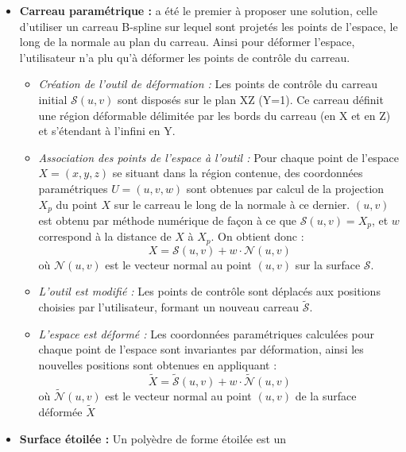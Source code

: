 \begin{itemize}
\item{\textbf{Carreau paramétrique :}} \cite{JLQ96} a été le premier à
  proposer une solution, celle d'utiliser un carreau B-spline sur
  lequel sont projetés les points de l'espace, le long de la normale
  au plan du carreau. Ainsi pour déformer l'espace, l'utilisateur n'a
  plu qu'à déformer les points de contrôle du carreau.
  \begin{itemize}
  \item{\textit{Création de l'outil de déformation :}} Les points de
    contrôle du carreau initial \( \mathcal{S}(u,v) \) sont disposés
    sur le plan XZ (Y=1). Ce carreau définit une région déformable
    délimitée par les bords du carreau (en X et en Z) et s'étendant à
    l'infini en Y.
  \item{\textit{Association des points de l'espace à l'outil :}} Pour
    chaque point de l'espace \( X = (x,y,z) \) se situant dans la
    région contenue, des coordonnées paramétriques \( U = (u,v,w) \)
    sont obtenues par calcul de la projection \( X_p \) du point \( X
    \) sur le carreau le long de la normale à ce dernier. \( (u,v) \)
    est obtenu par méthode numérique de façon à ce que \(
    \mathcal{S}(u,v) = X_p \), et \( w \) correspond à la distance de
    \( X \) à \( X_p \). On obtient donc :
    \begin{equation}
      X = \mathcal{S}(u,v) + w \cdot \mathcal{N}(u,v)
    \end{equation}
    où \( \mathcal{N}(u,v) \) est le vecteur normal au point \( (u,v)
    \) sur la surface \( \mathcal{S} \).
  \item{\textit{L'outil est modifié :}} Les points de contrôle sont
    déplacés aux positions choisies par l'utilisateur, formant un
    nouveau carreau \( \tilde{\mathcal{S}} \).
  \item{\textit{L'espace est déformé :}} Les coordonnées paramétriques
    calculées pour chaque point de l'espace sont invariantes par
    déformation, ainsi les nouvelles positions sont obtenues en
    appliquant :
    \begin{equation}
      \tilde{X} = \tilde{\mathcal{S}}(u,v) + w \cdot \tilde{\mathcal{N}}(u,v)
    \end{equation}
    où \( \tilde{\mathcal{N}}(u,v) \) est le vecteur normal au point
    \( (u,v) \) de la surface déformée \( \tilde{X} \)
  \end{itemize}
\item{\textbf{Surface étoilée :}} Un polyèdre de forme étoilée est un

\end{itemize}
